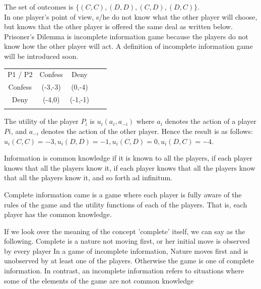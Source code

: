 \documentclass[11pt]{article}
\begin{document}
	The set of outcomes is $\{(C,C), (D,D), (C,D), (D,C)\}$.\\In one player's point of view, s/he do not know what the other player will choose, but knows that the other player is offered the same deal as written below. Prisoner's Dilemma is incomplete information game because the players do not know how the other player will act. A definition of incomplete information game will be introduced soon.%

	
\begin{center}
\begin{tabular}{cccll}
\cline{1-3}
\multicolumn{1}{|c|}{P1 / P2} & \multicolumn{1}{c|}{Confess} & \multicolumn{1}{c|}{Deny}    &  &  \\ \cline{1-3}
\multicolumn{1}{|c|}{Confess} & \multicolumn{1}{c|}{(-3,-3)} & \multicolumn{1}{c|}{(0,-4)}  &  &  \\ \cline{1-3}
\multicolumn{1}{|c|}{Deny}    & \multicolumn{1}{c|}{(-4,0)}  & \multicolumn{1}{c|}{(-1,-1)} &  &  \\ \cline{1-3}
\multicolumn{1}{l}{}          & \multicolumn{1}{l}{}         & \multicolumn{1}{l}{}         &  & 
\end{tabular}
\end{center}

	The utility of the player $P_i$ is $u_i(a_i, a_{-i})$ where $a_i$ denotes the action of a player $Pi$, and $a_{-i}$ denotes the action of the other player. Hence the result is as follows: 
	$u_i(C,C)=-3, u_i(D,D)=-1, u_i(C,D)=0, u_i(D,C)=-4$.


	Information is common knowledge if it is known to all the players, if each player knows that all the players know it, if each player knows that all the players know that all the players know it, and so forth ad infinitum.


	Complete information came is a game where each player is fully aware of the rules of the game and the utility functions of each of the players. 
	That is, each player has the common knowledge.
	
	
	If we look over the meaning of the concept 'complete' itself, we can say as the following. Complete is a nature not moving first, or her initial move is observed by every player
	In a game of incomplete information, Nature moves first and is unobserved by at least one of the players. Otherwise the game is one of complete information.
	In contrast, an incomplete information refers to situations where some of the elements of the game are not common knowledge
	
\end{document}
